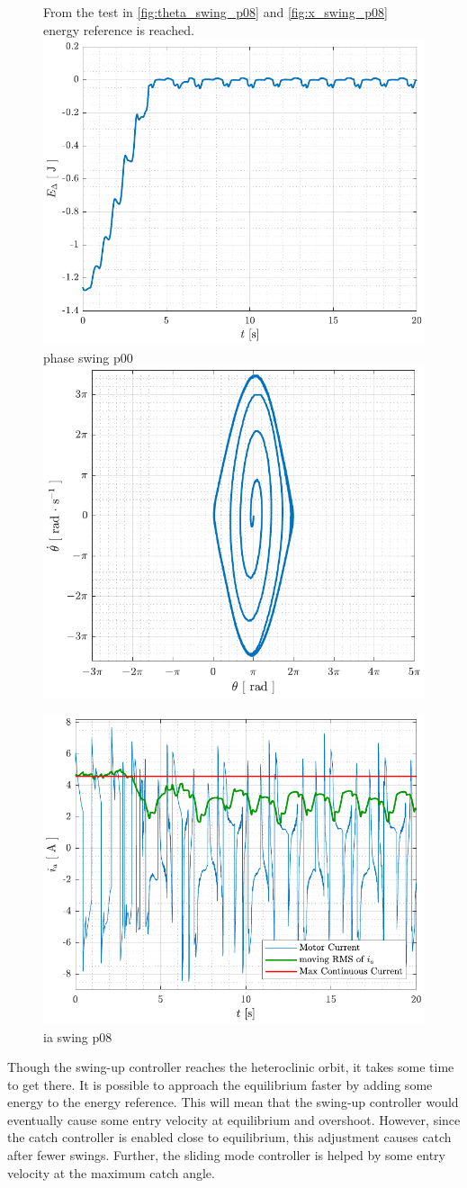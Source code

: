 \begin{figure}[H]
  \hspace{1cm}
  \captionbox
  {
    From the test in \autoref{fig:theta_swing_p08} and \ref{fig:x_swing_p08} energy reference is reached.
    \label{fig:Edelta_swing_p08}
  }
  {
    \hspace{-1cm}
    \includegraphics[width=.4\textwidth]{figures/Edelta_swing_p08}
  }
  \hspace{20pt}
  \captionbox 
  {
    phase swing p00
    \label{fig:phase_swing_p08}
  }
  {
    \hspace{-1cm}
    \includegraphics[width=.364\textwidth]{figures/phase_swing_p08}
  }  
\end{figure}

\begin{figure}[H]
  \includegraphics[width=.42\textwidth]{figures/ia_swing_p08}
  \caption{ ia swing p08 }
  \label{fig:ia_swing_p08}
\end{figure}




Though the swing-up controller reaches the heteroclinic orbit, it takes some time to get there. It is possible to approach the equilibrium faster by adding some energy to the energy reference. This will mean that the swing-up controller would eventually cause some entry velocity at equilibrium and overshoot. However, since the catch controller is enabled close to equilibrium, this adjustment causes catch after fewer swings. Further, the sliding mode controller is helped by some entry velocity at the maximum catch angle.



